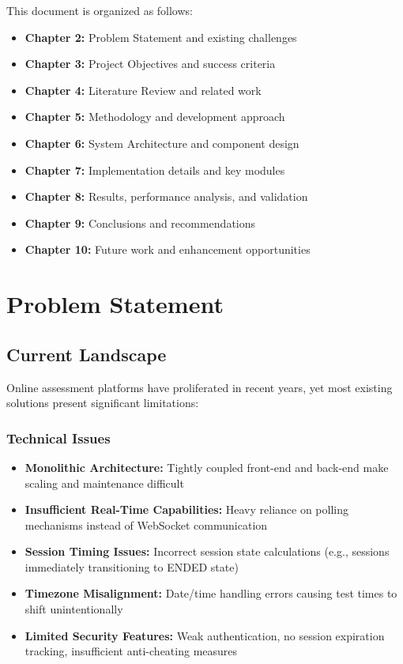 \documentclass[12pt,a4paper]{report}
\begin{document}
This document is organized as follows:

\begin{itemize}[left=0pt]
  \item \textbf{Chapter 2:} Problem Statement and existing challenges
  \item \textbf{Chapter 3:} Project Objectives and success criteria
  \item \textbf{Chapter 4:} Literature Review and related work
  \item \textbf{Chapter 5:} Methodology and development approach
  \item \textbf{Chapter 6:} System Architecture and component design
  \item \textbf{Chapter 7:} Implementation details and key modules
  \item \textbf{Chapter 8:} Results, performance analysis, and validation
  \item \textbf{Chapter 9:} Conclusions and recommendations
  \item \textbf{Chapter 10:} Future work and enhancement opportunities
\end{itemize}

\cleardoublepage


\chapter{Problem Statement}

\section{Current Landscape}

Online assessment platforms have proliferated in recent years, yet most existing solutions present significant limitations:

\subsection{Technical Issues}

\begin{itemize}[left=0pt]
  \item \textbf{Monolithic Architecture:} Tightly coupled front-end and back-end make scaling and maintenance difficult
  \item \textbf{Insufficient Real-Time Capabilities:} Heavy reliance on polling mechanisms instead of WebSocket communication
  \item \textbf{Session Timing Issues:} Incorrect session state calculations (e.g., sessions immediately transitioning to ENDED state)
  \item \textbf{Timezone Misalignment:} Date/time handling errors causing test times to shift unintentionally
  \item \textbf{Limited Security Features:} Weak authentication, no session expiration tracking, insufficient anti-cheating measures
\end{itemize}
\end{document}
